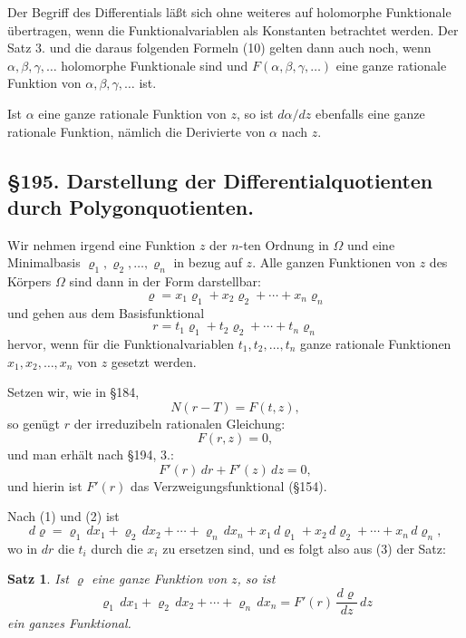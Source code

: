 \documentclass[12pt,a4paper]{article}
\newtheorem*{satz}{Satz}
\begin{document}
Der Begriff des Differentials läßt sich ohne weiteres auf holomorphe Funktionale übertragen, wenn die Funktionalvariablen als Konstanten betrachtet werden. Der Satz 3. und die daraus folgenden Formeln (10) gelten dann auch noch, wenn $\alpha, \beta, \gamma, \ldots$ holomorphe Funktionale sind und $F(\alpha, \beta, \gamma, \ldots)$ eine ganze rationale Funktion von $\alpha, \beta, \gamma, \ldots$ ist.

Ist $\alpha$ eine ganze rationale Funktion von $z$, so ist $d\alpha/dz$ ebenfalls eine ganze rationale Funktion, nämlich die Derivierte von $\alpha$ nach $z$.

\subsection*{\S 195. Darstellung der Differentialquotienten durch Polygonquotienten.}

Wir nehmen irgend eine Funktion $z$ der $n$-ten Ordnung in $\Omega$ und eine Minimalbasis $\varrho_1, \varrho_2, \ldots, \varrho_n$ in bezug auf $z$. Alle ganzen Funktionen von $z$ des Körpers $\Omega$ sind dann in der Form darstellbar:
\begin{equation}\label{eq:195-1}
\varrho = x_1\varrho_1 + x_2\varrho_2 + \cdots + x_n\varrho_n
\end{equation}
und gehen aus dem Basisfunktional
\begin{equation}\label{eq:195-2}
r = t_1\varrho_1 + t_2\varrho_2 + \cdots + t_n\varrho_n
\end{equation}
hervor, wenn für die Funktionalvariablen $t_1, t_2, \ldots, t_n$ ganze rationale Funktionen $x_1, x_2, \ldots, x_n$ von $z$ gesetzt werden.

Setzen wir, wie in \S 184,
\[
N(r - T) = F(t, z),
\]
so genügt $r$ der irreduzibeln rationalen Gleichung:
\[
F(r, z) = 0,
\]
und man erhält nach \S 194, 3.:
\begin{equation}\label{eq:195-3}
F'(r)\,dr + F'(z)\,dz = 0,
\end{equation}
und hierin ist $F'(r)$ das Verzweigungsfunktional (\S 154).

Nach (1) und (2) ist
\begin{equation}\label{eq:195-4}
d\varrho = \varrho_1\,dx_1 + \varrho_2\,dx_2 + \cdots + \varrho_n\,dx_n + x_1\,d\varrho_1 + x_2\,d\varrho_2 + \cdots + x_n\,d\varrho_n,
\end{equation}
wo in $dr$ die $t_i$ durch die $x_i$ zu ersetzen sind, und es folgt also aus (3) der Satz:

\begin{satz}
Ist $\varrho$ eine ganze Funktion von $z$, so ist
\begin{equation}\label{eq:195-5}
\varrho_1\,dx_1 + \varrho_2\,dx_2 + \cdots + \varrho_n\,dx_n = F'(r)\,\frac{d\varrho}{dz}\,dz
\end{equation}
ein ganzes Funktional.
\end{satz}
\end{document}
